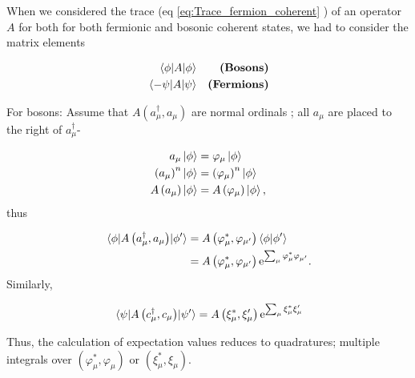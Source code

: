 When we considered the trace (eq \eqref{eq:Trace_fermion_coherent} ) of an operator \(A\) for both for both fermionic and bosonic coherent states, we had to consider the matrix elements

\begin{align*}
	\mel{\phi}{A}{\phi} && \textbf{(Bosons)}\\
	\mel{-\psi}{A}{\psi} && \textbf{(Fermions)} 
\end{align*}

For bosons: Assume that \(A(a_\mu^\dagger, a_\mu)\) are normal ordinals \label{unc:ordinals}; all \(a_\mu\) are placed to the right of \(a_\mu^\dagger\)-

\begin{align}
a_\mu\ket\phi &= \varphi_\mu\ket\phi \\
\left(a_\mu\right)^n\ket\phi &= \left(\varphi_\mu\right)^n\ket\phi \\
A\left(a_\mu\right)\ket\phi &= A\left(\varphi_\mu\right)\ket\phi,
\end{align}
thus

\begin{align}
\mel{\phi}{A\left( a_\mu^\dagger, a_\mu\right)}{\phi'}
&= A\left(\varphi_\mu^*, \varphi_{\mu'}\right)\braket{\phi}{\phi'} \\
&= A\left(\varphi_\mu^*, \varphi_{\mu'}\right)\mathrm{e}^{\sum_\mu\varphi_\mu^*\varphi_{\mu'}}. 
\end{align}
Similarly, 

\begin{equation}
\label{unc:labeling_on_states}
\mel{\psi}{A\left( c_\mu^\dagger,c_\mu\right)}{\psi'} = A\left(\xi_\mu^*,\xi_\mu'\right)\mathrm{e}^{\sum_\mu\xi_\mu^*\xi_\mu'}
\end{equation}

Thus, the calculation of expectation values reduces to quadratures; multiple integrals over \((\varphi_\mu^*, \varphi_\mu)\) or \((\xi_\mu^*, \xi_\mu)\).